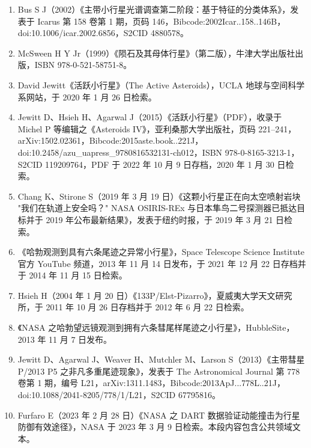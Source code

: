 \begin{enumerate}
\item Bus S J（2002）《主带小行星光谱调查第二阶段：基于特征的分类体系》，发表于 Icarus 第 158 卷第 1 期，页码 146，Bibcode:2002Icar..158..146B，doi:10.1006/icar.2002.6856，S2CID 4880578。

\item McSween H Y Jr（1999）《陨石及其母体行星》（第二版），牛津大学出版社出版，ISBN 978-0-521-58751-8。

\item David Jewitt《活跃小行星》（The Active Asteroids），UCLA 地球与空间科学系网站，于 2020 年 1 月 26 日检索。

\item Jewitt D、Hsieh H、Agarwal J（2015）《活跃小行星》（PDF），收录于 Michel P 等编辑之《Asteroids IV》，亚利桑那大学出版社，页码 221–241，arXiv:1502.02361，Bibcode:2015aste.book..221J，doi:10.2458/azu_uapress_9780816532131-ch012，ISBN 978-0-8165-3213-1，S2CID 119209764，PDF 于 2022 年 10 月 9 日存档，2020 年 1 月 30 日检索。

\item Chang K、Stirone S（2019 年 3 月 19 日）《这颗小行星正在向太空喷射岩块 "我们在轨道上安全吗？" NASA OSIRIS-REx 与日本隼鸟二号探测器已抵达目标并于 2019 年公布最新结果》，发表于纽约时报，于 2019 年 3 月 21 日检索。

\item 《哈勃观测到具有六条尾迹之异常小行星》，Space Telescope Science Institute 官方 YouTube 频道，2013 年 11 月 14 日发布，于 2021 年 12 月 22 日存档并于 2014 年 11 月 15 日检索。

\item Hsieh H（2004 年 1 月 20 日）《133P/Elst-Pizarro》，夏威夷大学天文研究所，于 2011 年 10 月 26 日存档并于 2012 年 6 月 22 日检索。

\item 《NASA 之哈勃望远镜观测到拥有六条彗尾样尾迹之小行星》，HubbleSite，2013 年 11 月 7 日发布。

\item Jewitt D、Agarwal J、Weaver H、Mutchler M、Larson S（2013）《主带彗星 P/2013 P5 之非凡多重尾迹现象》，发表于 The Astronomical Journal 第 778 卷第 1 期，编号 L21，arXiv:1311.1483，Bibcode:2013ApJ...778L..21J，doi:10.1088/2041-8205/778/1/L21，S2CID 67795816。

\item Furfaro E（2023 年 2 月 28 日）《NASA 之 DART 数据验证动能撞击为行星防御有效途径》，NASA 于 2023 年 3 月 9 日检索。本段内容包含公共领域文本。

\end{enumerate}
